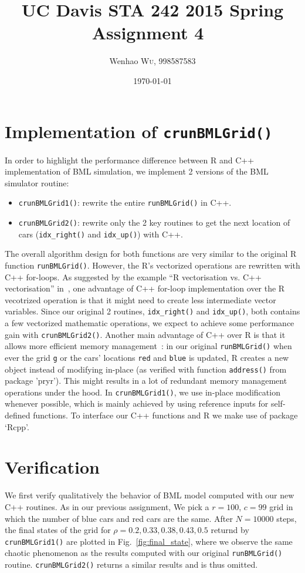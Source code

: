 \documentclass{article}
\title{UC Davis STA 242 2015 Spring Assignment 4~\cite{wu2015bmlgrid_v1.1}} %
\author{Wenhao \textsc{Wu}, 998587583} %
\date{\today} %
\begin{document}
\maketitle %


\section{Implementation of \texttt{crunBMLGrid()}}
In order to highlight the performance difference between R and C++
implementation of BML simulation, we implement 2 versions of the BML simulator
routine:
\begin{itemize}
    \item \texttt{crunBMLGrid1()}: rewrite the entire \texttt{runBMLGrid()} in
    C++.
    \item \texttt{crunBMLGrid2()}: rewrite only the 2 key routines to get the
    next location of cars (\texttt{idx\_right()} and \texttt{idx\_up()}) with
    C++.
\end{itemize}
The overall algorithm design for both functions are very similar to the original
R function \texttt{runBMLGrid()}. However, the R's vectorized operations are
rewritten with C++ for-loops. As suggested by the example ``R vectorisation vs.
C++ vectorisation'' in~\cite{wickham2014advanced}, one advantage of C++ for-loop
implementation over the R vecotrized operation is that it might need to create less
intermediate vector variables. Since our original 2 routines,
\texttt{idx\_right()} and \texttt{idx\_up()}, both contains a few vectorized
mathematic operations, we expect to achieve some performance gain with
\texttt{crunBMLGrid2()}. Another main advantage of C++ over R is that it allows
more efficient memory management~\cite{xian2014efficient}: in our original
\texttt{runBMLGrid()} when ever the grid \texttt{g} or the cars' locations \texttt{red} and \texttt{blue}
is updated, R creates a new object instead of modifying in-place (as verified
with function \texttt{address()} from package 'pryr'). This might
results in a lot of redundant memory management operations under the hood. In
\texttt{crunBMLGrid1()}, we use in-place modification whenever possible, which
is mainly achieved by using reference inputs for self-defined functions. To
interface our C++ functions and R we make use of package `Rcpp'.

\section{Verification}
We first verify qualitatively the behavior of BML model computed with our new
C++ routines. As in our previous assignment, We pick a
$r=100$, $c=99$ grid in which the number of blue cars and red cars are the same. After $N =
10000$ steps, the final states of the grid for $\rho = 0.2, 0.33, 0.38, 0.43,
0.5$ returnd by \texttt{crunBMLGrid1()} are plotted in
Fig.~\ref{fig:final_state}, where we observe the same chaotic phenomenon as the
results computed with our original \texttt{runBMLGrid()} routine.
\texttt{crunBMLGrid2()} returns a similar results and is thus omitted.
\end{document}
